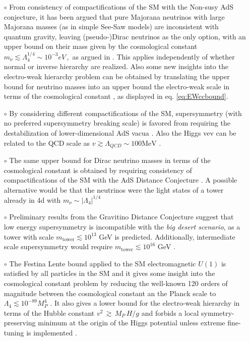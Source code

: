\documentclass[11pt,a4paper]{article}
\begin{document}
\begin{itemize}
\item[$\circ$]{From consistency of compactifications of the SM with the Non-susy AdS conjecture, it has been argued that pure Majorana neutrinos with large Majorana masses (as in simple See-Saw models) are inconsistent with quantum gravity, leaving \mbox{(pseudo-)Dirac} neutrinos as the only option, with an upper bound on their mass given by the cosmological constant $
m_{\nu}\lesssim \Lambda_{4}^{1/4}  \sim   10^{-3} eV \, ,  $
as argued in \cite{Ooguri:2018wrx, Ibanez:2017kvh,Hamada:2017yji}. This applies independently of whether normal or inverse hierarchy are realized.  Also some new insights into the electro-weak hierarchy problem can be obtained by  translating the upper bound for neutrino masses into an upper bound the electro-weak scale in terms of the cosmological constant \cite{Ibanez:2017oqr}, as displayed in eq. \eqref{eq:EWccbound}. 
}
\item[$\circ$]{By considering different compactifications of the SM, supersymmetry (with no preferred supersymmetry breaking scale) is favored from requiring the destabilization of lower-dimensional AdS vacua \cite{Gonzalo:2018dxi}. Also the Higgs vev can be related to the QCD scale as $v \gtrsim \Lambda_{Q C D} \sim 100 \mathrm{MeV}$ \cite{Gonzalo:2018tpb}.
}

\item[$\circ$]{The same upper bound for Dirac neutrino masses in terms of the cosmological constant is obtained by requiring consistency of compactifications of the SM with the AdS Distance Conjecture  \cite{Gonzalo:2021fma,Gonzalo:Toappear, GonzaloStrings}. A possible alternative would be that the neutrinos were the light states of a tower already in 4d with $m_{\nu}\sim |\Lambda_4|^{1/4}$ \cite{Gonzalo:2021fma,Gonzalo:Toappear,GonzaloStrings, Rudelius:2021oaz}
}

\item[$\circ$]{Preliminary results from the Gravitino Distance Conjecture suggest that low energy supersymmetry is incompatible with the \textit{big desert scenario}, as a tower with scale $m_{\mathrm{tower}}\lesssim 10^{13}$ GeV is predicted. Additionally, intermediate scale supersymmetry would require $m_{\mathrm{tower}}\lesssim 10^{16}$ GeV \cite{Castellano:2021yye}.
}

\item[$\circ$]{The Festina Lente bound applied to the SM electromagnetic $U(1)$ is satisfied by all particles in the SM \cite{Montero:2019ekk} and it gives some insight into the cosmological constant problem by reducing the well-known 120 orders of magnitude between the cosmological constant an the Planck scale  to $\Lambda_{4}\lesssim 10^{-89} M_P^4$ \cite{Montero:2021otb}. It also gives a lower bound for the electro-weak hierarchy in terms of the Hubble constant $v^2\, \gtrsim \, M_P \, H / g$ and forbids a local symmetry-preserving minimum at the origin of the Higgs potential unless extreme fine-tuning is implemented \cite{Montero:2021otb}.
}


\end{itemize}
\end{document}
